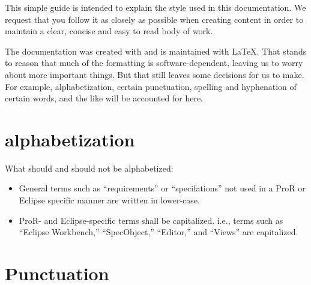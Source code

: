 % 

This simple guide is intended to explain the style used in this documentation.  We request that you follow it as closely as possible when creating content in order to maintain a clear, concise and easy to read body of work.

The documentation was created with and is maintained with \LaTeX.  That stands to reason that much of the formatting is software-dependent, leaving us to worry about more important things.  But that still leaves some decisions for us to make.  For example, alphabetization, certain punctuation, spelling and hyphenation of certain words, and the like will be accounted for here.

\section{alphabetization}

What should and should not be alphabetized:

\begin{itemize}

\item
  General terms such as ``requirements'' or ``specifations'' not used in a ProR or Eclipse specific manner are written in lower-case.
\item
  ProR- and Eclipse-specific terms shall be capitalized.  i.e., terms such as ``Eclipse Workbench,'' ``SpecObject,'' ``Editor,'' and ``Views'' are capitalized.

\end{itemize}

\section{Punctuation}

